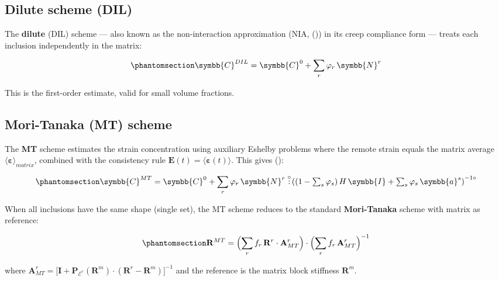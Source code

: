 \documentclass[
  a4paper,
  numbers=noendperiod,
  DIV=12]{scrreprt}
\newcommand{\uu}[1]{{\symbf{{#1}}}}
\newcommand{\uuuu}[1]{{\symbb{{#1}}}}
\newcommand{\volt}[1]{{#1}^{-1\circ}}
\newcommand{\dcirc}{\overset{\circ}{:}}
\begin{document}
\subsection{Dilute scheme (DIL)}\label{dilute-scheme-dil}

The \textbf{dilute} (DIL) scheme --- also known as the non-interaction
approximation (NIA, ()) in its creep compliance form --- treats each inclusion
independently in the matrix:

\begin{equation}\protect\phantomsection\label{eq-dil-alv}{
\uuuu{C}^{DIL} = \uuuu{C}^0 + \sum_r \varphi_r\,\uuuu{N}^r
}\end{equation}

This is the first-order estimate, valid for small volume fractions.

\subsection{Mori-Tanaka (MT) scheme}\label{mori-tanaka-mt-scheme}

The \textbf{MT} scheme estimates the strain concentration using
auxiliary Eshelby problems where the remote strain equals the matrix
average \(\langle\boldsymbol{\varepsilon}\rangle_{matrix}\), combined
with the consistency rule
\(\uu{E}(t) = \langle\boldsymbol{\varepsilon}(t)\rangle\). This gives
():

\begin{equation}\protect\phantomsection\label{eq-mtb-alv}{
\uuuu{C}^{MT} = \uuuu{C}^0 +
\sum_r \varphi_r\,\uuuu{N}^r \dcirc
\volt{\!\left((1-\textstyle\sum_s\varphi_s)\,H\,\uuuu{I} + \sum_s \varphi_s\,\uuuu{a}^s\right)}
}\end{equation}

When all inclusions have the same shape (single set), the MT scheme
reduces to the standard \textbf{Mori-Tanaka} scheme with matrix as
reference:

\begin{equation}\protect\phantomsection\label{eq-MT-block}{
\mathbf{R}^{MT} = \Bigl(\sum_r f_r\,\mathbf{R}^r\cdot\mathbf{A}^r_{MT}\Bigr)\cdot\Bigl(\sum_r f_r\,\mathbf{A}^r_{MT}\Bigr)^{-1}
}\end{equation}

where
\(\mathbf{A}^r_{MT} = \bigl[\mathbf{I} + \mathbf{P}_{\mathcal{E}^r}(\mathbf{R}^m)\cdot(\mathbf{R}^r - \mathbf{R}^m)\bigr]^{-1}\)
and the reference is the matrix block stiffness \(\mathbf{R}^m\).
\end{document}
